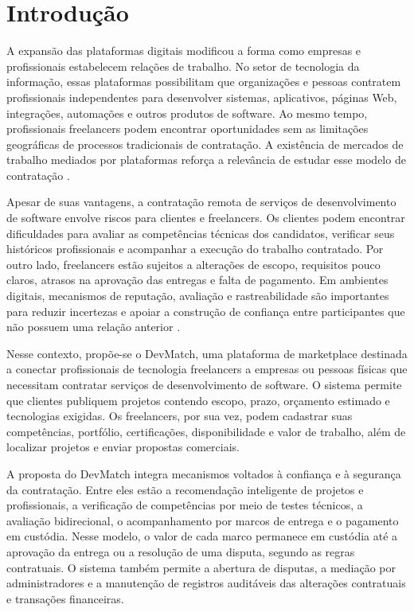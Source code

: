 \documentclass[portuguese]{sbcreviews-2025}
\begin{document}

\section{Introdução}
\label{sec:intro}

A expansão das plataformas digitais modificou a forma como empresas
e profissionais estabelecem relações de trabalho. No setor de
tecnologia da informação, essas plataformas possibilitam que
organizações e pessoas contratem profissionais independentes para
desenvolver sistemas, aplicativos, páginas Web, integrações,
automações e outros produtos de software. Ao mesmo tempo,
profissionais freelancers podem encontrar oportunidades sem as
limitações geográficas de processos tradicionais de contratação.
A existência de mercados de trabalho mediados por plataformas
reforça a relevância de estudar esse modelo de contratação \citep{kassi2018}.

Apesar de suas vantagens, a contratação remota de serviços de
desenvolvimento de software envolve riscos para clientes e
freelancers. Os clientes podem encontrar dificuldades para avaliar
as competências técnicas dos candidatos, verificar seus históricos
profissionais e acompanhar a execução do trabalho contratado. Por
outro lado, freelancers estão sujeitos a alterações de escopo,
requisitos pouco claros, atrasos na aprovação das entregas e falta
de pagamento. Em ambientes digitais, mecanismos de reputação,
avaliação e rastreabilidade são importantes para reduzir incertezas
e apoiar a construção de confiança entre participantes que não
possuem uma relação anterior \citep{josang2007}.

Nesse contexto, propõe-se o DevMatch, uma plataforma de marketplace
destinada a conectar profissionais de tecnologia freelancers a
empresas ou pessoas físicas que necessitam contratar serviços de
desenvolvimento de software. O sistema permite que clientes publiquem
projetos contendo escopo, prazo, orçamento estimado e tecnologias
exigidas. Os freelancers, por sua vez, podem cadastrar suas
competências, portfólio, certificações, disponibilidade e valor de
trabalho, além de localizar projetos e enviar propostas comerciais.

A proposta do DevMatch integra mecanismos voltados à
confiança e à segurança da contratação. Entre eles estão a
recomendação inteligente de projetos e profissionais, a verificação
de competências por meio de testes técnicos, a avaliação
bidirecional, o acompanhamento por marcos de entrega e o pagamento
em custódia. Nesse modelo, o valor de cada marco permanece em custódia
até a aprovação da entrega ou a resolução de uma disputa, segundo
as regras contratuais. O sistema também permite a abertura
de disputas, a mediação por administradores e a manutenção de
registros auditáveis das alterações contratuais e transações
financeiras.
\end{document}
